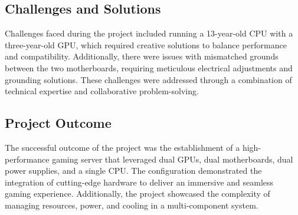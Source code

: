\subsection{Challenges and Solutions}

Challenges faced during the project included running a 13-year-old CPU with a three-year-old GPU, which required creative solutions to balance performance and compatibility. Additionally, there were issues with mismatched grounds between the two motherboards, requiring meticulous electrical adjustments and grounding solutions. These challenges were addressed through a combination of technical expertise and collaborative problem-solving.

\subsection{Project Outcome}

The successful outcome of the project was the establishment of a high-performance gaming server that leveraged dual GPUs, dual motherboards, dual power supplies, and a single CPU. The configuration demonstrated the integration of cutting-edge hardware to deliver an immersive and seamless gaming experience. Additionally, the project showcased the complexity of managing resources, power, and cooling in a multi-component system.
